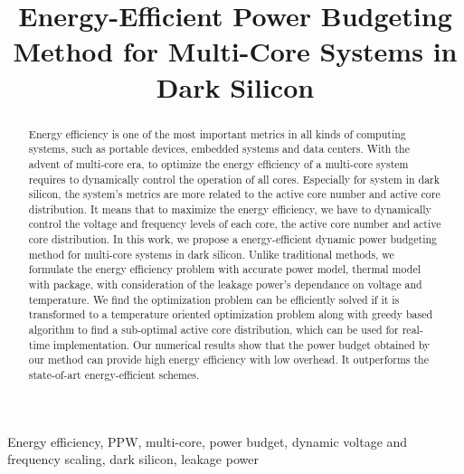 \documentclass[10pt,journal,compsoc]{IEEEtran}
\begin{document}
%
\title{Energy-Efficient Power Budgeting Method for Multi-Core Systems in Dark Silicon}




\maketitle


\maketitle
\begin{abstract}

Energy efficiency is one of the most important metrics in all kinds of computing systems, such as portable devices, embedded systems and data centers. With the advent of multi-core era, to optimize the energy efficiency of a multi-core system requires to dynamically control the operation of all cores. Especially for system in dark silicon, the system's metrics are more related to the active core number and active core distribution. It means that to maximize the energy efficiency, we have to dynamically control the voltage and frequency levels of each core, the active core number and active core distribution. In this work, we propose a energy-efficient dynamic power budgeting method for multi-core systems in dark silicon. Unlike traditional methods, we formulate the energy efficiency problem with accurate power model, thermal model with package, with consideration of the leakage power's dependance on voltage and temperature. We find the optimization problem can be efficiently solved if it is transformed to a temperature oriented optimization problem along with greedy based algorithm to find a sub-optimal active core distribution, which can be used for real-time implementation. Our numerical results show that the power budget obtained by our method can provide high energy efficiency with low overhead. It outperforms the state-of-art energy-efficient schemes.

\end{abstract}
\begin{IEEEkeywords}
Energy efficiency, PPW, multi-core, power budget, dynamic voltage and frequency scaling, dark silicon, leakage power
\end{IEEEkeywords}
\end{document}
